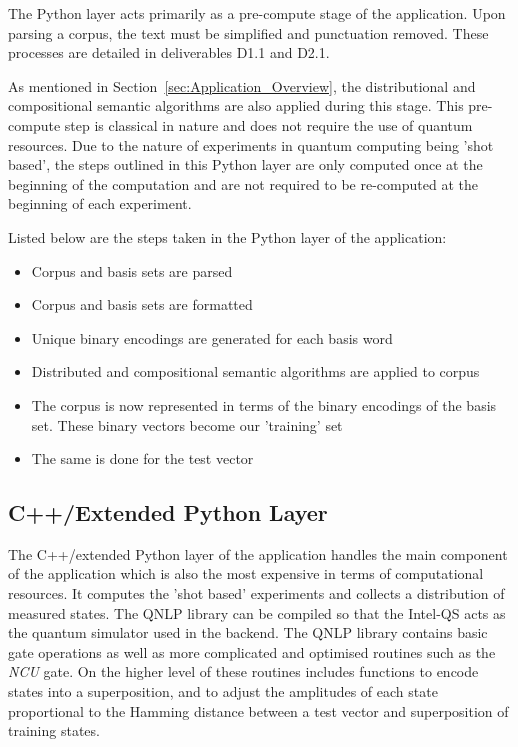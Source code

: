 The Python layer acts primarily as a pre-compute stage of the application. Upon parsing a corpus, the text must be simplified and punctuation removed. These processes are detailed in deliverables D1.1 and D2.1.

As mentioned in Section~\ref{sec:Application_Overview}, the distributional and compositional semantic algorithms are also applied during this stage. This pre-compute step is classical in nature and does not require the use of quantum resources. Due to the nature of experiments in quantum computing being 'shot based', the steps outlined in this Python layer are only computed once at the beginning of the computation and are not required to be re-computed at the beginning of each experiment.

Listed below are the steps taken in the Python layer of the application:
\begin{itemize}
    \item Corpus and basis sets are parsed
    \item Corpus and basis sets are formatted
    \item Unique binary encodings are generated for each basis word
    \item Distributed and compositional semantic algorithms are applied to corpus
    \item The corpus is now represented in terms of the binary encodings of the basis set. These binary vectors become our 'training' set
    \item The same is done for the test vector
\end{itemize}

\subsection{C++/Extended Python Layer}
\label{sec:cpp_extended_python_layer}

The C++/extended Python layer of the application handles the main component of the application which is also the most expensive in terms of computational resources. It computes the 'shot based' experiments and collects a distribution of measured states. The QNLP library can be compiled so that the Intel\textregistered-QS acts as the quantum simulator used in the backend. The QNLP library contains basic gate operations as well as more complicated and optimised routines such as the \textit{NCU} gate. On the higher level of these routines includes functions to encode states into a superposition, and to adjust the amplitudes of each state proportional to the Hamming distance between a test vector and superposition of training states.


